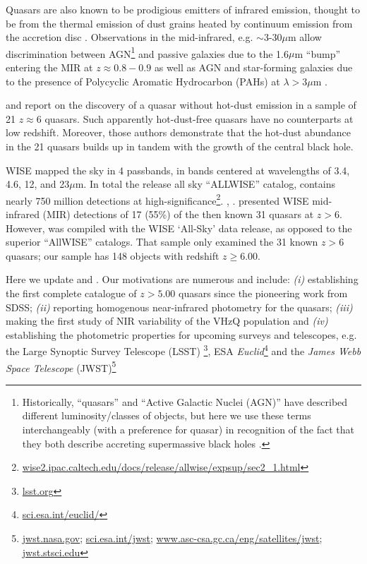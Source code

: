 \documentclass[usenatbib]{mnras}
\begin{document}
Quasars are also known to be prodigious emitters of infrared emission,
thought to be from the thermal emission of dust grains heated by
continuum emission from the accretion disc
\citep[e.g.,][]{Richards2006b, Leipski2014, Hill2014, Hickox2017}.
Observations in the mid-infrared, e.g. $\sim$3-30$\mu$m allow
discrimination between AGN\footnote{Historically, ``quasars'' and
``Active Galactic Nuclei (AGN)'' have described different
luminosity/classes of objects, but here we use these terms
interchangeably (with a preference for quasar) in recognition of the
fact that they both describe accreting supermassive black holes
\citep[e.g.][]{Haardt2016book}.}  and passive galaxies due to the
1.6$\mu$m ``bump'' entering the MIR at $z\approx0.8-0.9$ \citep[e.g.,
][]{Wright1994, Sawicki2002, Lacy2004, Stern2005, Richards2006b,
Timlin2016} as well as AGN and star-forming galaxies due to the
presence of Polycyclic Aromatic Hydrocarbon (PAHs) at $\lambda >3\mu$m
\citep[e.g., ][]{Yan2007, Tielens2008}.

\citet{Jiang2006dust} and \citet{Jiang2010} report on the discovery of
a quasar without hot-dust emission in a sample of 21 $z\approx6$
quasars. Such apparently hot-dust-free quasars have no counterparts at
low redshift. Moreover, those authors demonstrate that the hot-dust
abundance in the 21 quasars builds up in tandem with the growth of the
central black hole.

WISE mapped the sky in 4 passbands, in bands centered at wavelengths
of 3.4, 4.6, 12, and 23$\mu$m.  In total the release all sky
``ALLWISE'' catalog, contains nearly 750 million detections at
high-significance\footnote{\href{wise2.ipac.caltech.edu/docs/release/allwise/expsup/sec2\_1.html}{wise2.ipac.caltech.edu/docs/release/allwise/expsup/sec2\_1.html}}. \citet{Assef2013},
\citet{Stern2012}. \citet{Blain2013} presented WISE mid-infrared (MIR)
detections of 17 (55\%) of the then known 31 quasars at $z >
6$. However, \citet{Blain2013} was compiled with the WISE `All-Sky'
data release, as opposed to the superior ``AllWISE'' catalogs. That
sample only examined the 31 known $z>6$ quasars; our sample has 148
objects with redshift $z \geq 6.00$.

Here we update \citet{Jiang2010} and \citet{Blain2013} \citep[along
with Table 8 of][]{Banados2016}. Our motivations are numerous and
include: {\it (i)} establishing the first complete catalogue of
$z>5.00$ quasars since the pioneering work from SDSS; {\it (ii)}
reporting homogenous near-infrared photometry for the quasars; {\it
(iii)} making the first study of NIR variability of the VHzQ
population and {\it (iv)} establishing the photometric properties for
upcoming surveys and telescopes, e.g. the Large Synoptic Survey
Telescope (LSST) \footnote{\href{https://www.lsst.org}{{lsst.org}}},
ESA {\it
Euclid}\footnote{\href{https://sci.esa.int/euclid/}{sci.esa.int/euclid/}}
and the {\it James Webb Space Telescope}
(JWST)\footnote{\href{https://www.jwst.nasa.gov/}{jwst.nasa.gov};
\href{https://sci.esa.int/jwst/}{sci.esa.int/jwst};
\href{https://www.asc-csa.gc.ca/eng/satellites/jwst/}{www.asc-csa.gc.ca/eng/satellites/jwst};
\href{https://jwst.stsci.edu/}{jwst.stsci.edu}}
\end{document}
